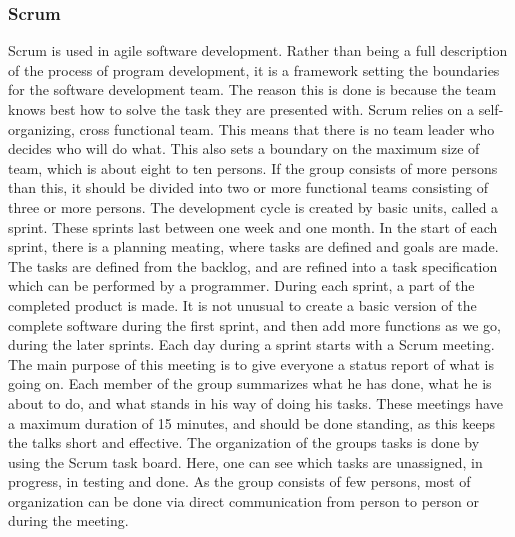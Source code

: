 \subsubsection{Scrum}
Scrum is used in agile software development. Rather than being a full description of the process of program development, it is a framework setting the boundaries for the software development team\cite{bib:asdas}. The reason this is done is because the team knows best how to solve the task they are presented with.
\newline
\newline
Scrum relies on a self-organizing, cross functional team. This means that there is no team leader who decides who will do what. This also sets a boundary on the maximum size of team, which is about eight to ten persons. If the group consists of more persons than this, it should be divided into two or more functional teams consisting of three or more persons.
\newline
\newline
The development cycle is created by basic units, called a sprint. These sprints last between one week and one month\cite{bib:scrum}. In the start of each sprint, there is a planning meating, where tasks are defined and goals are made. The tasks are defined from the backlog, and are refined into a task specification which can be performed by a programmer. During each sprint, a part of the completed product is made. It is not unusual to create a basic version of the complete software during the first sprint, and then add more functions as we go, during the later sprints.
\newline
\newline
Each day during a sprint starts with a Scrum meeting. The main purpose of this meeting is to give everyone a status report of what is going on. Each member of the group summarizes what he has done, what he is about to do, and what stands in his way of doing his tasks. These meetings have a maximum duration of 15 minutes, and should be done standing, as this keeps the talks short and effective.
\newline
\newline
The organization of the groups tasks is done by using the Scrum task board. Here, one can see which tasks are unassigned, in progress, in testing and done. As the group consists of few persons, most of organization can be done via direct communication from person to person or during the meeting.


